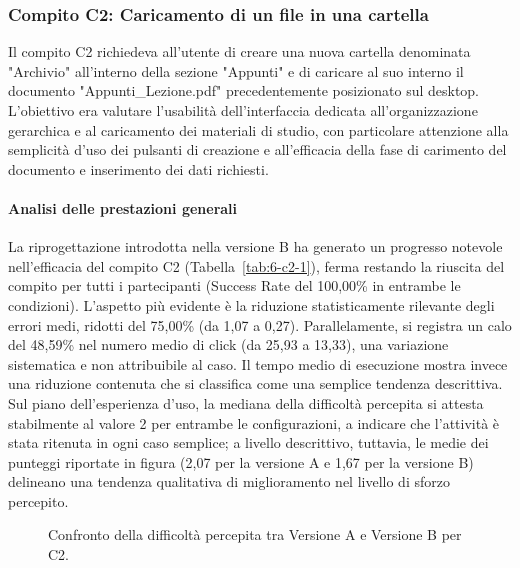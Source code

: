 \subsubsection{Compito C2: Caricamento di un file in una cartella}

Il compito C2 richiedeva all'utente di creare una nuova cartella denominata "Archivio" all'interno della sezione "Appunti" e di caricare al suo interno il documento "Appunti\_Lezione.pdf" precedentemente posizionato sul desktop. L'obiettivo era valutare l'usabilità dell'interfaccia dedicata all'organizzazione gerarchica e al caricamento dei materiali di studio, con particolare attenzione alla semplicità d'uso dei pulsanti di creazione e all'efficacia della fase di carimento del documento e inserimento dei dati richiesti.

\paragraph{Analisi delle prestazioni generali}

La riprogettazione introdotta nella versione B ha generato un progresso notevole nell'efficacia del compito C2 (Tabella~\ref{tab:6-c2-1}), ferma restando la riuscita del compito per tutti i partecipanti (Success Rate del 100,00\% in entrambe le condizioni). L'aspetto più evidente è la riduzione statisticamente rilevante degli errori medi, ridotti del 75,00\% (da 1,07 a 0,27). Parallelamente, si registra un calo del 48,59\% nel numero medio di click (da 25,93 a 13,33), una variazione sistematica e non attribuibile al caso. Il tempo medio di esecuzione mostra invece una riduzione contenuta che si classifica come una semplice tendenza descrittiva. Sul piano dell'esperienza d'uso, la mediana della difficoltà percepita si attesta stabilmente al valore 2 per entrambe le configurazioni, a indicare che l'attività è stata ritenuta in ogni caso semplice; a livello descrittivo, tuttavia, le medie dei punteggi riportate in figura (2,07 per la versione A e 1,67 per la versione B) delineano una tendenza qualitativa di miglioramento nel livello di sforzo percepito.

\begin{figure}[H]
	\centering
	\caption{Confronto della difficoltà percepita tra Versione A e Versione B per C2.}
	\label{fig:6-c2-1}
\end{figure}

